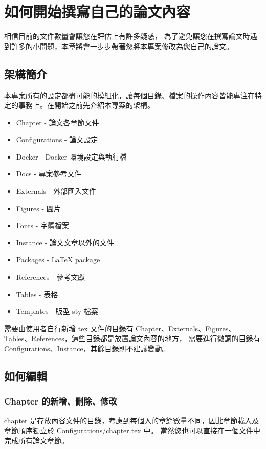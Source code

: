 \chapter{如何開始撰寫自己的論文內容} \label{ch_how2start}

相信目前的文件數量會讓您在評估上有許多疑惑，
為了避免讓您在撰寫論文時遇到許多的小問題，本章將會一步步帶著您將本專案修改為您自己的論文。

\section{架構簡介}

本專案所有的設定都盡可能的模組化，讓每個目錄、檔案的操作內容皆能專注在特定的事務上。在開始之前先介紹本專案的架構。

\begin{itemize}
    \item Chapter - 論文各章節文件
    \item Configurations - 論文設定
    \item Docker - Docker 環境設定與執行檔
    \item Docs - 專案參考文件
    \item Externals - 外部匯入文件
    \item Figures - 圖片
    \item Fonts - 字體檔案
    \item Instance - 論文文章以外的文件
    \item Packages - LaTeX package
    \item References - 參考文獻
    \item Tables - 表格
    \item Templates - 版型 sty 檔案
\end{itemize}

需要由使用者自行新增 tex 文件的目錄有 Chapter、Externals、Figures、Tables、References，這些目錄都是放置論文內容的地方，
需要進行微調的目錄有 Configurations、Instance，其餘目錄則不建議變動。

\section{如何編輯}

\subsection*{Chapter 的新增、刪除、修改}

chapter 是存放內容文件的目錄，考慮到每個人的章節數量不同，因此章節載入及章節順序獨立於 Configurations/chapter.tex 中。
當然您也可以直接在一個文件中完成所有論文章節。


